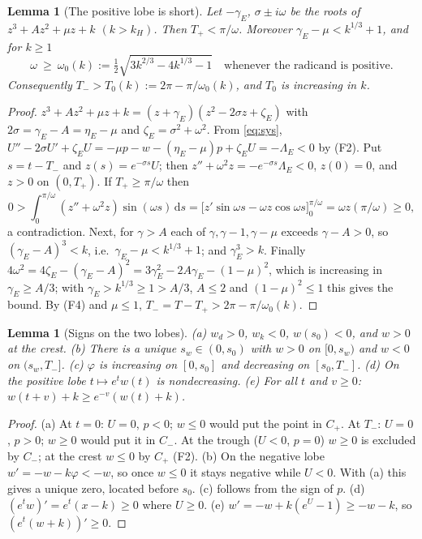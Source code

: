 \documentclass[11pt,a4paper]{article}
\newtheorem{lemma}[theorem]{Lemma}
\theoremstyle{remark}\newtheorem{remark}[theorem]{Remark}
\newcommand{\dd}{\,\mathrm d}
\begin{document}
\begin{lemma}[The positive lobe is short]\label{lem:short}
Let $-\gamma_E$, $\sigma\pm i\omega$ be the roots of $z^3+Az^2+\mu z+k$ $(k>k_H)$. Then
$T_+<\pi/\omega$. Moreover $\gamma_E-\mu<k^{1/3}+1$, and for $k\ge1$
\[
\omega\ \ge\ \omega_0(k):=\tfrac12\sqrt{3k^{2/3}-4k^{1/3}-1}\quad\text{whenever the radicand is positive.}
\]
Consequently $T_->T_0(k):=2\pi-\pi/\omega_0(k)$, and $T_0$ is increasing in $k$.
\end{lemma}
\begin{proof}
$z^3+Az^2+\mu z+k=(z+\gamma_E)(z^2-2\sigma z+\zeta_E)$ with $2\sigma=\gamma_E-A=\eta_E-\mu$ and
$\zeta_E=\sigma^2+\omega^2$. From \eqref{eq:sys},
$U''-2\sigma U'+\zeta_EU=-\mu p-w-(\eta_E-\mu)p+\zeta_EU=-\Lambda_E<0$ by (F2).
Put $s=t-T_-$ and $z(s)=e^{-\sigma s}U$; then $z''+\omega^2z=-e^{-\sigma s}\Lambda_E<0$,
$z(0)=0$, and $z>0$ on $(0,T_+)$. If $T_+\ge\pi/\omega$ then
\[
0>\int_0^{\pi/\omega}(z''+\omega^2z)\sin(\omega s)\dd s
=\bigl[z'\sin\omega s-\omega z\cos\omega s\bigr]_0^{\pi/\omega}=\omega z(\pi/\omega)\ge0,
\]
a contradiction. Next, for $\gamma>A$ each of $\gamma,\gamma-1,\gamma-\mu$ exceeds $\gamma-A>0$, so
$(\gamma_E-A)^3<k$, i.e.\ $\gamma_E-\mu<k^{1/3}+1$; and $\gamma_E^3>k$. Finally
$4\omega^2=4\zeta_E-(\gamma_E-A)^2=3\gamma_E^2-2A\gamma_E-(1-\mu)^2$, which is increasing in
$\gamma_E\ge A/3$; with $\gamma_E>k^{1/3}\ge1>A/3$, $A\le2$ and $(1-\mu)^2\le1$ this gives the bound.
By (F4) and $\mu\le1$, $T_-=T-T_+>2\pi-\pi/\omega_0(k)$.
\end{proof}

\begin{lemma}[Signs on the two lobes]\label{lem:signs}
\textup{(a)} $w_d>0$, $w_k<0$, $w(s_0)<0$, and $w>0$ at the crest.
\textup{(b)} There is a unique $s_w\in(0,s_0)$ with $w>0$ on $[0,s_w)$ and $w<0$ on $(s_w,T_-]$.
\textup{(c)} $\varphi$ is increasing on $[0,s_0]$ and decreasing on $[s_0,T_-]$.
\textup{(d)} On the positive lobe $t\mapsto e^tw(t)$ is nondecreasing.
\textup{(e)} For all $t$ and $v\ge0$: $w(t+v)+k\ge e^{-v}(w(t)+k)$.
\end{lemma}
\begin{proof}
(a) At $t=0$: $U=0$, $p<0$; $w\le0$ would put the point in $C_+$. At $T_-$: $U=0$, $p>0$; $w\ge0$
would put it in $C_-$. At the trough ($U<0$, $p=0$) $w\ge0$ is excluded by $C_-$; at the crest
$w\le0$ by $C_+$ (F2).
(b) On the negative lobe $w'=-w-k\varphi<-w$, so once $w\le0$ it stays negative while $U<0$. With (a)
this gives a unique zero, located before $s_0$. (c) follows from the sign of $p$.
(d) $(e^tw)'=e^t(x-k)\ge0$ where $U\ge0$. (e) $w'=-w+k(e^U-1)\ge-w-k$, so $(e^t(w+k))'\ge0$.
\end{proof}
\end{document}
